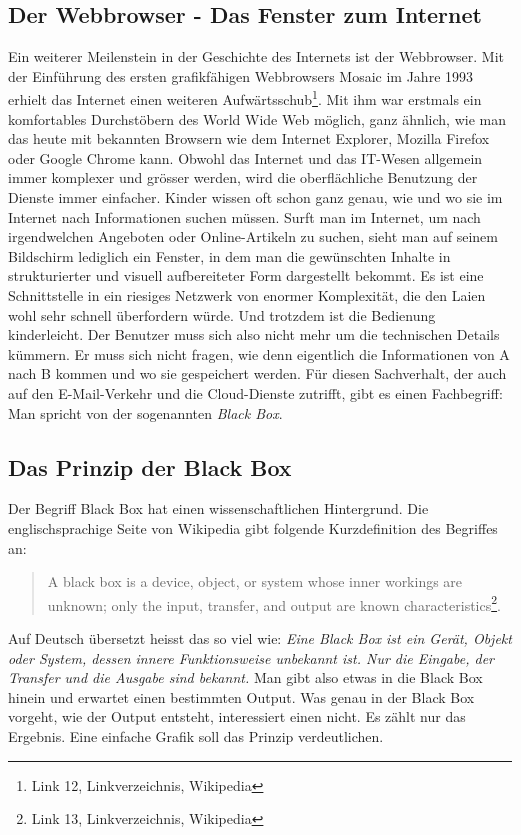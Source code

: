\subsection{Der Webbrowser - Das Fenster zum Internet}
Ein weiterer Meilenstein in der Geschichte des Internets ist der Webbrowser. Mit der Einführung des ersten grafikfähigen Webbrowsers Mosaic im Jahre 1993 erhielt das Internet einen weiteren Aufwärtsschub\footnote{Link 12, Linkverzeichnis, Wikipedia}.
Mit ihm war erstmals ein komfortables Durchstöbern des World Wide Web möglich, ganz ähnlich, wie man das heute mit bekannten Browsern wie dem Internet Explorer, Mozilla Firefox oder Google Chrome kann. Obwohl das Internet und das IT-Wesen allgemein immer komplexer und grösser werden, wird die oberflächliche Benutzung der Dienste immer einfacher. Kinder wissen oft schon ganz genau, wie und wo sie im Internet nach Informationen suchen müssen. Surft man im Internet, um nach irgendwelchen Angeboten oder Online-Artikeln zu suchen, sieht man auf seinem Bildschirm lediglich ein Fenster, in dem man die gewünschten Inhalte in strukturierter und visuell aufbereiteter Form dargestellt bekommt. Es ist eine Schnittstelle in ein riesiges Netzwerk von enormer Komplexität, die den Laien wohl sehr schnell überfordern würde. Und trotzdem ist die Bedienung kinderleicht. Der Benutzer muss sich also nicht mehr um die technischen Details kümmern. Er muss sich nicht fragen, wie denn eigentlich die Informationen von A nach B kommen und wo sie gespeichert werden. Für diesen Sachverhalt, der auch auf den E-Mail-Verkehr und die Cloud-Dienste zutrifft, gibt es einen Fachbegriff: Man spricht von der sogenannten \textit{Black Box}.

\subsection{Das Prinzip der Black Box}
Der Begriff Black Box hat einen wissenschaftlichen Hintergrund. Die englischsprachige Seite von Wikipedia gibt folgende Kurzdefinition des Begriffes an:

\begin{quote}
  A black box is a device, object, or system whose inner workings are unknown; only the input, transfer, and output are known characteristics\footnote{Link 13, Linkverzeichnis, Wikipedia}.
\end{quote}

Auf Deutsch übersetzt heisst das so viel wie: \textit{Eine Black Box ist ein Gerät, Objekt oder System, dessen innere Funktionsweise unbekannt ist. Nur die Eingabe, der Transfer und die Ausgabe sind bekannt.}
Man gibt also etwas in die Black Box hinein und erwartet einen bestimmten Output. Was genau in der Black Box vorgeht, wie der Output entsteht, interessiert einen nicht. Es zählt nur das Ergebnis. Eine einfache Grafik soll das Prinzip verdeutlichen.

